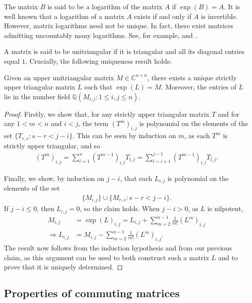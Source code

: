 The matrix $B$ is said to be a logarithm of the matrix $A$ if $\exp(B) = A$. It is well known that a logarithm of a matrix $A$ exists if and only if $A$ is invertible. However, matrix logarithms need not be unique. In fact, there exist matrices admitting uncountably many logarithms. See, for example, \cite{MatrixLogs1} and \cite{MatrixLogs2}.

A matrix is said to be unitriangular if it is triangular and all its diagonal entries equal $1$. Crucially, the following uniqueness result holds:

\begin{theorem}
\label{logarithm_uniqueness}
Given an upper unitriangular matrix $M \in \mathbb{C}^{n \times n}$, there exists a unique strictly upper triangular matrix $L$ such that $\exp(L)=M$. Moreover, the entries of $L$ lie in the number field $\mathbb{Q}(M_{i,j}: 1 \leq i,j \leq n)$.
\end{theorem}

\begin{proof}
Firstly, we show that, for any strictly upper triangular matrix $T$ and for any $1<m<n$ and $i<j$, the term $(T^{m})_{i,j}$ is polynomial on the elements of the set $\lbrace T_{r,s} : s-r<j-i \rbrace$. This can be seen by induction on $m$, as each $T^{m}$ is strictly upper triangular, and so
\begin{align*}
(T^{m})_{i,j} = \sum\limits_{l=1}^{n} (T^{m-1})_{i,l} T_{l,j} = \sum\limits_{l=i+1}^{j-1} (T^{m-1})_{i,l} T_{l,j} .
\end{align*}

Finally, we show, by induction on $j-i$, that each $L_{i,j}$ is polynomial on the elements of the set
\begin{align*}
\lbrace M_{i,j} \rbrace \cup \lbrace M_{r,s} : s-r < j-i \rbrace .
\end{align*}
If $j-i \leq 0$, then $L_{i,j}=0$, so the claim holds. When $j-i>0$, as $L$ is nilpotent,
\begin{align*}
M_{i,j} &= \exp(L)_{i,j} = L_{i,j} + \sum\limits_{m=2}^{n-1} \frac{1}{m!} (L^{m})_{i,j} \\ \Rightarrow L_{i,j} &= M_{i,j} - \sum\limits_{m=2}^{n-1} \frac{1}{m!} (L^{m})_{i,j} .
\end{align*}
The result now follows from the induction hypothesis and from our previous claim, as this argument can be used to both construct such a matrix $L$ and to prove that it is uniquely determined.
\end{proof}

\subsection{Properties of commuting matrices}

